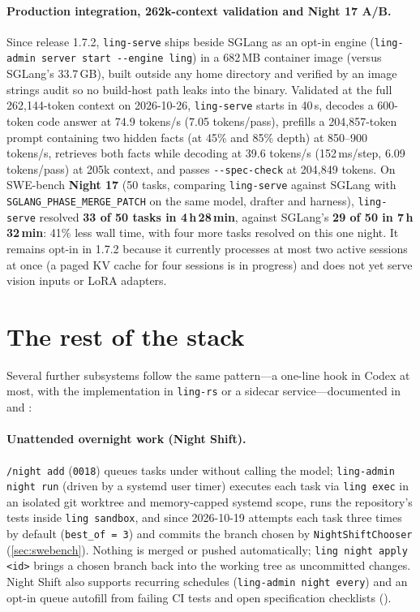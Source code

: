 \documentclass[11pt]{article}
\newcommand{\code}[1]{\texttt{#1}}
\begin{document}
\paragraph{Production integration, 262k-context validation and Night 17 A/B.} Since release 1.7.2,
\code{ling-serve} ships beside SGLang as an opt-in engine (\code{ling-admin server start -{}-engine
ling}) in a 682\,MB container image (versus SGLang's 33.7\,GB), built outside any home directory
and verified by an image strings audit so no build-host path leaks into the binary. Validated at the
full 262{,}144-token context on 2026-10-26, \code{ling-serve} starts in 40\,s, decodes a 600-token
code answer at 74.9 tokens/s (7.05 tokens/pass), prefills a 204{,}857-token prompt containing two
hidden facts (at 45\% and 85\% depth) at 850--900 tokens/s, retrieves both facts while decoding at
39.6 tokens/s (152\,ms/step, 6.09 tokens/pass) at 205k context, and passes \code{-{}-spec-check}
at 204{,}849 tokens. On SWE-bench \textbf{Night 17} (50 tasks, comparing \code{ling-serve} against
SGLang with \code{SGLANG\_PHASE\_MERGE\_PATCH} on the same model, drafter and harness),
\code{ling-serve} resolved \textbf{33 of 50 tasks in 4\,h\,28\,min}, against SGLang's \textbf{29 of
50 in 7\,h\,32\,min}: 41\% less wall time, with four more tasks resolved on this one night. It remains opt-in in
1.7.2 because it currently processes at most two active sessions at once (a paged KV cache for four
sessions is in progress) and does not yet serve vision inputs or LoRA adapters.

\section{The rest of the stack}
\label{sec:rest}

Several further subsystems follow the same pattern—a one-line hook in Codex at most, with the
implementation in \code{ling-rs} or a sidecar service—documented in  and
:

\paragraph{Unattended overnight work (Night Shift).} \code{/night add} (\code{0018}) queues tasks
under  without calling the model; \code{ling-admin night run}
(driven by a systemd user timer)
executes each task via \code{ling exec} in an isolated git worktree and memory-capped systemd
scope, runs the repository's tests inside \code{ling sandbox}, and since 2026-10-19 attempts each
task three times by default (\code{best\_of = 3}) and commits the branch chosen by
\code{NightShiftChooser} (\cref{sec:swebench}). Nothing is merged or pushed automatically;
\code{ling night apply <id>} brings a chosen branch back into the working tree as uncommitted
changes. Night Shift also supports recurring schedules (\code{ling-admin night every}) and an
opt-in queue autofill from failing CI tests and open specification checklists
().
\end{document}
